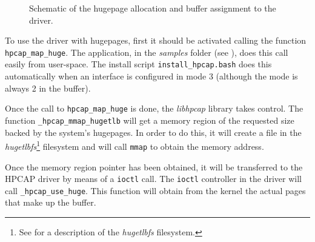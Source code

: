 \documentclass[oneside]{hpman}
\begin{document}
\begin{figure}[hbtp]
\caption{Schematic of the hugepage allocation and buffer assignment to the driver.}
\label{fig:HPCAPMapping}
\end{figure}

To use the driver with hugepages, first it should be activated calling the function \texttt{hpcap\_map\_huge}. The  application, in the \textit{samples} folder (see ), does this call easily from user-space. The install script \texttt{install\_hpcap.bash} does this automatically when an interface is configured in mode 3 (although the mode is always 2 in the buffer).

Once the call to \texttt{hpcap\_map\_huge} is done, the \textit{libhpcap} library takes control. The function \texttt{\_hpcap\_mmap\_hugetlb} will get a memory region of the requested size backed by the system's hugepages. In order to do this, it will create a file in the \textit{hugetlbfs}\footnote{See  for a description of the \textit{hugetlbfs} filesystem.} filesystem and will call \texttt{mmap} to obtain the memory address.

Once the memory region pointer has been obtained, it will be transferred to the HPCAP driver by means of a \texttt{ioctl} call. The \texttt{ioctl} controller in the driver will call \texttt{\_hpcap\_use\_huge}. This function will obtain from the kernel the actual pages that make up the buffer.
\end{document}

